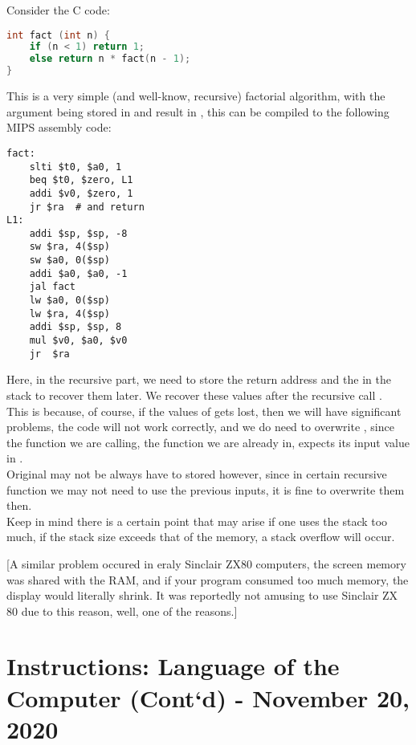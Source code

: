 \documentclass[11pt,a4paper,twocolumn]{book}
\begin{document}
Consider the C code:

\begin{lstlisting}[language=C]
int fact (int n) {
	if (n < 1) return 1;
	else return n * fact(n - 1);
}
\end{lstlisting}

This is a very simple (and well-know, recursive) factorial algorithm, with the argument  being stored in  and result in , this can be compiled to the following MIPS assembly code:

\begin{lstlisting}
fact:
	slti $t0, $a0, 1
	beq $t0, $zero, L1
	addi $v0, $zero, 1
	jr $ra	# and return
L1:
	addi $sp, $sp, -8
	sw $ra, 4($sp)
	sw $a0, 0($sp)
	addi $a0, $a0, -1
	jal fact
	lw $a0, 0($sp)
	lw $ra, 4($sp)
	addi $sp, $sp, 8
	mul $v0, $a0, $v0
	jr  $ra
\end{lstlisting}

Here, in the recursive part, we need to store the return address and the  in the stack to recover them later. We recover these values after the recursive call .\\

This is because, of course, if the values of  gets lost, then we will have significant problems, the code will not work correctly, and we do need to overwrite , since the function we are calling, the function we are already in, expects its input value in .\\

Original  may not be always have to stored however, since in certain recursive function we may not need to use the previous inputs, it is fine to overwrite them then.\\

Keep in mind there is a certain point that may arise if one uses the stack too much, if the stack size exceeds that of the memory, a stack overflow will occur.

[A similar problem occured in eraly Sinclair ZX80 computers, the screen memory was shared with the RAM, and if your program consumed too much memory, the display would literally shrink. It was reportedly not amusing to use Sinclair ZX 80 due to this reason, well, one of the reasons.]


\chapter{Instructions: Language of the Computer (Cont`d) - November 20, 2020}
\end{document}
